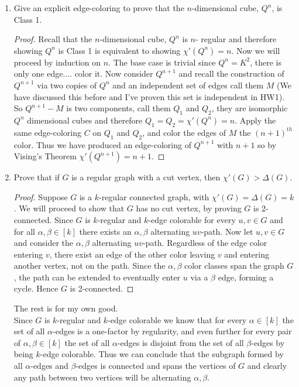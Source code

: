 \documentclass[12pt]{article}
\begin{document}
\begin{enumerate}
	\item Give an explicit edge-coloring to prove that the $n$-dimensional cube, $Q^n$, is Class 1.
	\begin{proof} Recall that the  $n$-dimensional cube, $Q^n$ is $n$- regular and therefore showing $Q^n$ is Class 1 is equivalent to showing $\chi'(Q^n) = n$. Now we will proceed by induction on $n$. The base case is trivial since $Q^n = K^2$, there is only one edge.... color it. Now consider $Q^{n+1}$ and recall the construction of $Q^{n + 1}$ via two copies of $Q^n$ and an independent set of edges call them $M$ (We have discussed this before and I've proven this set is independent in HW1). So $Q^{n + 1} - M$ is two components, call them $Q_1$ and $Q_2$, they are isomorphic $Q^n$ dimensional cubes and therefore $Q_1 = Q_2 = \chi'(Q^n) = n$. Apply the same edge-coloring $C$ on $Q_1$ and $Q_2$, and color the edges of $M$ the $(n + 1)^{th}$ color. Thus we have produced an edge-coloring of $Q^{n + 1}$ with $n + 1$ so by Vising's Theorem $\chi'(Q^{n+1}) = n+1$.
	\end{proof}
	\newpage
	










	\item Prove that if $G$ is a regular graph with a cut vertex, then $\chi'(G) > \Delta(G)$.
	\begin{proof} Suppose $G$ is a $k$-regular connected graph, with $\chi'(G) = \Delta(G) = k$. We will proceed to show that $G$ has no cut vertex, by proving $G$ is 2-connected. Since $G$ is $k$-regular and $k$-edge colorable for every $u, v \in G$ and for all $\alpha, \beta \in [k]$ there exists an $\alpha,\beta$ alternating $uv$-path. Now let $u, v \in G$ and consider the $\alpha,\beta$ alternating $uv$-path. Regardless of the edge color entering $v$, there exist an edge of the other color leaving $v$ and entering another vertex, not on the path. Since the $\alpha,\beta$ color classes span the graph $G$, the path can be extended to eventually enter $u$ via a $\beta$ edge, forming a cycle. Hence $G$ is 2-connected. 
 




	\end{proof}

	The rest is for my own good. \\


	Since $G$ is $k$-regular and $k$-edge colorable we know that for every $\alpha \in [k]$ the set of all $\alpha$-edges is a one-factor by regularity, and even further for every pair of $\alpha, \beta \in [k]$ the set of all $\alpha$-edges is disjoint from the set of all $\beta$-edges by being $k$-edge colorable. Thus we can conclude that the subgraph formed by all $\alpha$-edges and $\beta$-edges is connected and spans the vertices of $G$ and clearly any path between two vertices will be alternating $\alpha, \beta$.
	

\end{enumerate}
\end{document}
